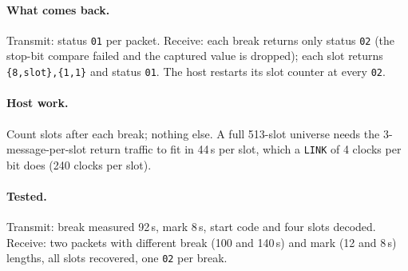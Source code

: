 \documentclass[11pt,a4paper]{article}
\newcommand{\sig}[1]{\texttt{#1}}
\begin{document}
\paragraph{What comes back.} Transmit: status \texttt{01} per packet. Receive: each break returns only status \texttt{02} (the stop-bit compare failed and the captured value is dropped); each slot returns \texttt{\{8,slot\},\{1,1\}} and status \texttt{01}. The host restarts its slot counter at every \texttt{02}.

\paragraph{Host work.} Count slots after each break; nothing else. A full 513-slot universe needs the 3-message-per-slot return traffic to fit in 44\,\textmu s per slot, which a \sig{LINK} of 4 clocks per bit does (240 clocks per slot).

\paragraph{Tested.} Transmit: break measured 92\,\textmu s, mark 8\,\textmu s, start code and four slots decoded. Receive: two packets with different break (100 and 140\,\textmu s) and mark (12 and 8\,\textmu s) lengths, all slots recovered, one \texttt{02} per break.
\end{document}

